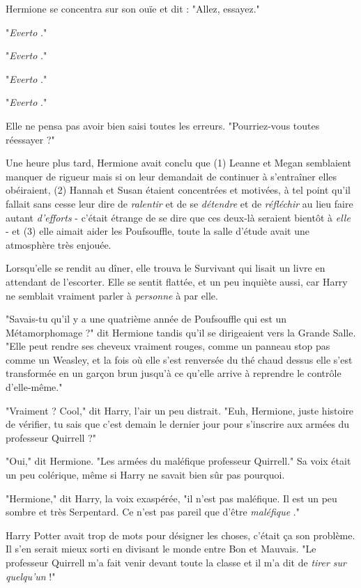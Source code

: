 Hermione se concentra sur son ouïe et dit : "Allez, essayez."

"\emph{Everto} ."

"\emph{Everto} ."

"\emph{Everto} ."

"\emph{Everto} ."

Elle ne pensa pas avoir bien saisi toutes les erreurs. "Pourriez-vous toutes réessayer ?"

Une heure plus tard, Hermione avait conclu que (1) Leanne et Megan semblaient manquer de rigueur mais si on leur demandait de continuer à s'entraîner elles obéiraient, (2) Hannah et Susan étaient concentrées et motivées, à tel point qu'il fallait sans cesse leur dire de \emph{ralentir}  et de se \emph{détendre}  et de \emph{réfléchir}  au lieu faire autant \emph{d'efforts } - c'était étrange de se dire que ces deux-là seraient bientôt à \emph{elle}  - et (3) elle aimait aider les Poufsouffle, toute la salle d'étude avait une atmosphère très enjouée.

Lorsqu'elle se rendit au dîner, elle trouva le Survivant qui lisait un livre en attendant de l'escorter. Elle se sentit flattée, et un peu inquiète aussi, car Harry ne semblait vraiment parler à \emph{personne}  à par elle.

"Savais-tu qu'il y a une quatrième année de Poufsouffle qui est un Métamorphomage ?" dit Hermione tandis qu'il se dirigeaient vers la Grande Salle. "Elle peut rendre ses cheveux vraiment rouges, comme un panneau stop pas comme un Weasley, et la fois où elle s'est renversée du thé chaud dessus elle s'est transformée en un garçon brun jusqu'à ce qu'elle arrive à reprendre le contrôle d'elle-même."

"Vraiment ? Cool," dit Harry, l'air un peu distrait. "Euh, Hermione, juste histoire de vérifier, tu sais que c'est demain le dernier jour pour s'inscrire aux armées du professeur Quirrell ?"

"Oui," dit Hermione. "Les armées du maléfique professeur Quirrell." Sa voix était un peu colérique, même si Harry ne savait bien sûr pas pourquoi.

"Hermione," dit Harry, la voix exaspérée, "il n'est pas maléfique. Il est un peu sombre et très Serpentard. Ce n'est pas pareil que d'être \emph{maléfique} ."

Harry Potter avait trop de mots pour désigner les choses, c'était ça son problème. Il s'en serait mieux sorti en divisant le monde entre Bon et Mauvais. "Le professeur Quirrell m'a fait venir devant toute la classe et il m'a dit de \emph{tirer sur quelqu'un}  !"

